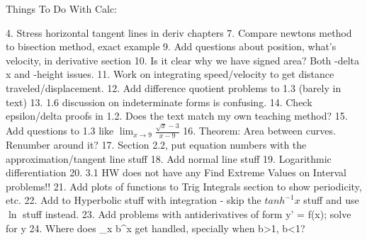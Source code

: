 Things To Do With Calc:

4. Stress horizontal tangent lines in deriv chapters
7. Compare newtons method to bisection method, exact example
9. Add questions about position, what's velocity, in derivative section
10. Is it clear why we have signed area? Both -delta x and -height issues.
11. Work on integrating speed/velocity to get distance traveled/displacement.
12. Add difference quotient problems to 1.3 (barely in text)
13. 1.6 discussion on indeterminate forms is confusing.
14. Check epsilon/delta proofs in 1.2. Does the text match my own teaching method?
15. Add questions to 1.3 like $\lim_{x\to9}\frac{\sqrt{x}-3}{x-9}$
16. Theorem: Area between curves. Renumber around it?
17. Section 2.2, put equation numbers with the approximation/tangent line stuff
18. Add normal line stuff
19. Logarithmic differentiation
20. 3.1 HW does not have any Find Extreme Values on Interval problems!!
21. Add plots of functions to Trig Integrals section to show periodicity, etc.
22. Add to Hyperbolic stuff with integration - skip the $tanh^{-1}x$ stuff and use $\ln $ stuff instead.
23. Add problems with antiderivatives of form y' = f(x); solve for y
24. Where does \lim_{x\to\infty} b^x get handled, specially when b>1, b<1?
